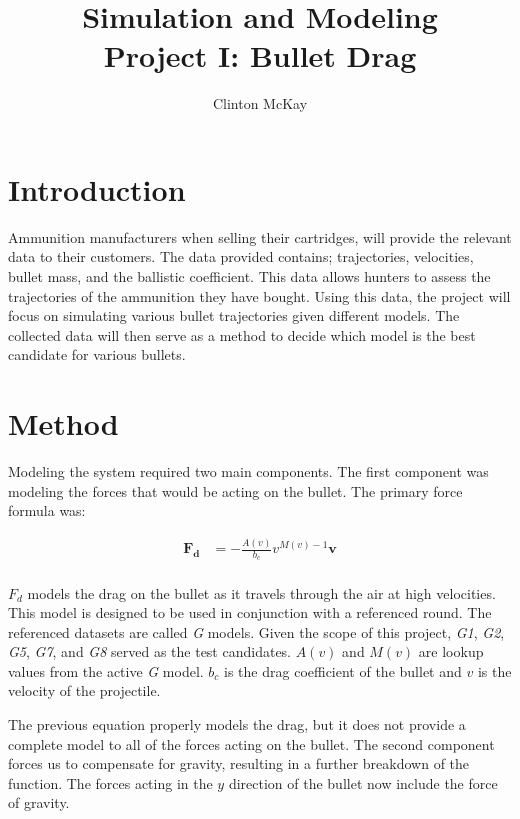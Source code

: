 \documentclass{article}%
\begin{document}
    \title{Simulation and Modeling\\Project I: Bullet Drag}
    \author{Clinton McKay}
    \maketitle

    \twocolumn

    \section{Introduction}
    Ammunition manufacturers when selling their cartridges, will provide the relevant data to their customers. The data provided contains; trajectories, velocities, bullet mass, and the ballistic coefficient. This data allows hunters to assess the trajectories of the ammunition they have bought. Using this data, the project will focus on simulating various bullet trajectories given different models. The collected data will then serve as a method to decide which model is the best candidate for various bullets. 

    \section{Method}
    Modeling the system required two main components. The first component was modeling the forces that would be acting on the bullet. The primary force formula was:

    \begin{align*}
        \mathbf{F_d} &= -\frac{A(v)}{b_c} v^{M(v)-1} \mathbf{v}\\
    \end{align*}
    
    $F_d$ models the drag on the bullet as it travels through the air at high velocities. This model is designed to be used in conjunction with a referenced round. The referenced datasets are called {\em G} models. Given the scope of this project, {\em G1}, {\em G2}, {\em G5}, {\em G7}, and {\em G8} served as the test candidates. $A(v)$ and $M(v)$ are lookup values from the active {\em G} model. $b_c$ is the drag coefficient of the bullet and $v$ is the velocity of the projectile. 

    The previous equation properly models the drag, but it does not provide a complete model to all of the forces acting on the bullet. The second component forces us to compensate for gravity, resulting in a further breakdown of the function. The forces acting in the $y$ direction of the bullet now include the force of gravity. 
    
\end{document}
